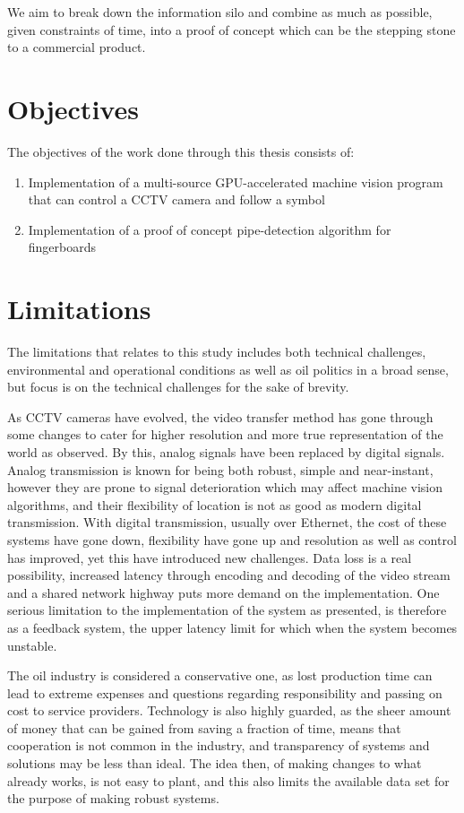 We aim to break down the information silo and combine as much as possible, given constraints of time, into a proof of concept which can be the stepping stone to a commercial product.

\section{Objectives}
The objectives of the work done through this thesis consists of:
\begin{enumerate}
  \item Implementation of a multi-source GPU-accelerated machine vision program that can control a CCTV camera and follow a symbol
  \item Implementation of a proof of concept pipe-detection algorithm for fingerboards
\end{enumerate}

\section{Limitations}
The limitations that relates to this study includes both technical challenges, environmental and operational conditions as well as oil politics in a broad sense, but focus is on the technical challenges for the sake of brevity.

As CCTV cameras have evolved, the video transfer method has gone through some changes to cater for higher resolution and more true representation of the world as observed. By this, analog signals have been replaced by digital signals. Analog transmission is known for being both robust, simple and near-instant, however they are prone to signal deterioration which may affect machine vision algorithms, and their flexibility of location is not as good as modern digital transmission. With digital transmission, usually over Ethernet, the cost of these systems have gone down, flexibility have gone up and resolution as well as control has improved, yet this have introduced new challenges. Data loss is a real possibility, increased latency through encoding and decoding of the video stream and a shared network highway puts more demand on the implementation. One serious limitation to the implementation of the system as presented, is therefore as a feedback system, the upper latency limit for which when the system becomes unstable.

The oil industry is considered a conservative one, as lost production time can lead to extreme expenses and questions regarding responsibility and passing on cost to service providers. Technology is also highly guarded, as the sheer amount of money that can be gained from saving a fraction of time, means that cooperation is not common in the industry, and transparency of systems and solutions may be less than ideal. The idea then, of making changes to what already works, is not easy to plant, and this also limits the available data set for the purpose of making robust systems.

